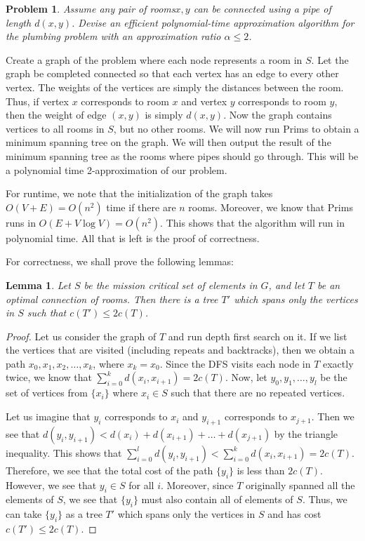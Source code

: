 \documentclass[psamsfonts]{amsart}
\newtheorem{prob}{Problem}[section]
\newtheorem{lem}[thm]{Lemma}
\newenvironment{sol}{{\bfseries Solution}}{\qedsymbol}
\theoremstyle{definition}
\theoremstyle{remark}
\numberwithin{equation}{section}
\begin{document}
\begin{prob}
Assume any pair of rooms$x,y$ can be connected using a pipe of length $d(x,y)$. Devise an efficient polynomial-time approximation algorithm for the plumbing problem with an approximation ratio $\alpha \leq 2$. 
\end{prob}

\begin{sol}
Create a graph of the problem where each node represents a room in $S$. Let the graph be completed connected so that each vertex has an edge to every other vertex. The weights of the vertices are simply the distances between the room. Thus, if vertex $x$ corresponds to room $x$ and vertex $y$ corresponds to room $y$, then the weight of edge $(x,y)$ is simply $d(x,y)$. Now the graph contains vertices to all rooms in $S$, but no other rooms. We will now run Prims to obtain a minimum spanning tree on the graph. We will then output the result of the minimum spanning tree as the rooms where pipes should go through. This will be a polynomial time 2-approximation of our problem.

For runtime, we note that the initialization of the graph takes $O(V + E) = O(n^2)$ time if there are $n$ rooms. Moreover, we know that Prims runs in $O(E + V \log V) = O(n^2)$. This shows that the algorithm will run in polynomial time. All that is left is the proof of correctness.

For correctness, we shall prove the following lemmas:

\begin{lem}
Let $S$ be the mission critical set of elements in $G$, and let $T$ be an optimal connection of rooms. Then there is a tree $T'$ which spans only the vertices in $S$ such that $c(T') \leq 2 c(T)$. 
\end{lem}

\begin{proof}
Let us consider the graph of $T$ and run depth first search on it. If we list the vertices that are visited (including repeats and backtracks), then we obtain a path $x_0, x_1, x_2, \ldots, x_k$, where $x_k = x_0$. Since the DFS visits each node in $T$ exactly twice, we know that $\sum_{i=0}^k d(x_i, x_{i+1}) = 2 c(T)$. Now, let $y_0, y_1, \ldots, y_l$ be the set of vertices from $\{ x_i \}$ where $x_i \in S$ such that there are no repeated vertices. 

Let us imagine that $y_i$ corresponds to $x_i$ and $y_{i+1}$ corresponds to $x_{j+1}$. Then we see that $d(y_i, y_{i+1}) < d(x_i) + d(x_{i+1}) + \ldots + d(x_{j+1})$ by the triangle inequality. This shows that $\sum_{i=0}^l d(y_i, y_{i+1}) < \sum_{i=0}^k d(x_i, x_{i+1}) = 2 c(T)$. Therefore, we see that the total cost of the path $\{y_i\}$ is less than $2 c(T)$. However, we see that $y_i \in S$ for all $i$. Moreover, since $T$ originally spanned all the elements of $S$, we see that $\{y_i\}$ must also contain all of elements of $S$. Thus, we can take $\{y_i\}$ as a tree $T'$ which spans only the vertices in $S$ and has cost $c(T') \leq 2 c(T)$.
\end{proof}


\end{sol}
\end{document}
